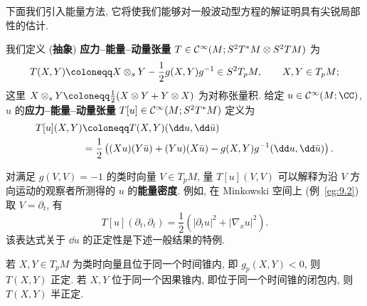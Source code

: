 下面我们引入能量方法, 它将使我们能够对一般波动型方程的解证明具有尖锐局部性的估计.

\begin{definition}[应力--能量--动量张量]\label{def:9.10}
我们定义 (\textbf{抽象}) \textbf{应力--能量--动量张量} $T \in \mathcal{C}^\infty(M; S^2 T^* M \otimes S^2 T M)$ 为
\begin{equation}\label{eq:9.13}
    T(X, Y) \defeq X \otimes_s Y - \frac12 g(X, Y) g^{-1} \in S^2 T_p M, \qquad X, Y \in T_p M;
\end{equation}
这里 $X \otimes_s Y \defeq \frac12 (X \otimes Y + Y \otimes X)$ 为对称张量积. 给定 $u \in \Smooth(M; \CC)$, $u$ 的\textbf{应力--能量--动量张量} $T[u] \in \mathcal{C}^\infty(M; S^2 T^* M)$ 定义为
\begin{equation}\label{eq:9.14}
    \begin{aligned}
        T[u](X, Y) &\defeq T(X, Y)(\dd u, \dd \bar u) \\
        &= \frac12 \left( (X u)(Y \bar u) + (Y u)(X \bar u) - g(X, Y) g^{-1}(\dd u, \dd \bar u) \right).
    \end{aligned}
\end{equation}
\end{definition}

对满足 $g(V, V) = -1$ 的类时向量 $V \in T_p M$, 量 $T[u](V, V)$ 可以解释为沿 $V$ 方向运动的观察者所测得的 $u$ 的\textbf{能量密度}. 例如, 在 Minkowski 空间上 (例~\ref{eg:9.2}) 取 $V = \partial_t$, 有
\begin{equation}\label{eq:9.15}
    T[u](\partial_t, \partial_t) = \frac12 \left( |\partial_t u|^2 + |\nabla_x u|^2 \right).
\end{equation}
该表达式关于 $\dd u$ 的正定性是下述一般结果的特例.

\begin{proposition}[$T$ 的正定性]\label{prop:9.11}
若 $X, Y \in T_p M$ 为类时向量且位于同一个时间锥内, 即 $g_p(X, Y) < 0$, 则 $T(X, Y)$ 正定. 若 $X, Y$ 位于同一个因果锥内, 即位于同一个时间锥的闭包内, 则 $T(X, Y)$ 半正定.
\end{proposition}

